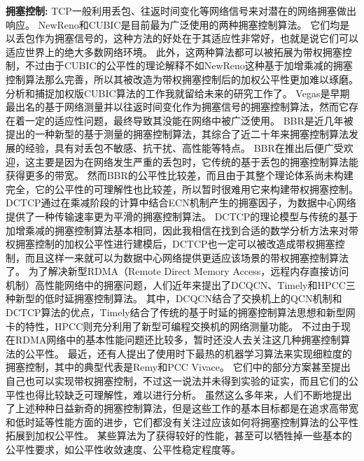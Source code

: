 \documentclass[winfonts]{njuthesis}
\begin{document}
{\bf 拥塞控制: }
TCP一般利用丢包\cite{jacobson1990modified,Henderson2012NewReno,ha2008cubic}、往返时间变化\cite{brakmo1995tcp,cardwell2016bbr,arun2018copa,Zeng2019cc}等网络信号来对潜在的网络拥塞做出响应。
NewReno\cite{Henderson2012NewReno}和CUBIC\cite{ha2008cubic}是目前最为广泛使用的两种拥塞控制算法。
它们均是以丢包作为拥塞信号的，这种方法的好处在于其适应性非常好，也就是说它们可以适应世界上的绝大多数网络环境。
此外，这两种算法都可以被拓展为带权拥塞控制，不过由于CUBIC的公平性的理论解释不如NewReno这种基于加增乘减的拥塞控制算法那么完善，所以其被改造为带权拥塞控制后的加权公平性更加难以琢磨。
分析和捕捉加权版CUBIC算法的工作我就留给未来的研究工作了。
Vegas\cite{brakmo1995tcp}是早期最出名的基于网络测量并以往返时间变化作为拥塞信号的拥塞控制算法，然而它存在着一定的适应性问题，最终导致其没能在网络中被广泛使用。
BBR\cite{cardwell2016bbr}是近几年被提出的一种新型的基于测量的拥塞控制算法，其综合了近二十年来拥塞控制算法发展的经验，具有对丢包不敏感、抗干扰、高性能等特点。
BBR在推出后便广受欢迎，这主要是因为在网络发生严重的丢包时，它传统的基于丢包的拥塞控制算法能获得更多的带宽。
然而BBR的公平性比较差，而且由于其整个理论体系尚未构建完全，它的公平性的可理解性也比较差，所以暂时很难用它来构建带权拥塞控制。
DCTCP\cite{alizadeh2010data,alizadeh2011analysis}通过在乘减阶段的计算中结合ECN机制产生的拥塞因子，为数据中心网络提供了一种传输速率更为平滑的拥塞控制算法。
DCTCP的理论模型与传统的基于加增乘减的拥塞控制算法基本相同，因此我相信在找到合适的数学分析方法来对带权拥塞控制的加权公平性进行建模后，DCTCP也一定可以被改造成带权拥塞控制，而且这样一来就可以为数据中心网络提供更适应该场景的带权拥塞控制算法了。
为了解决新型RDMA（Remote Direct Memory Access，远程内存直接访问机制）高性能网络中的拥塞问题，人们近年来提出了DCQCN\cite{zhu2015congestion}、Timely\cite{mittal2015timely}和HPCC\cite{li2019hpcc}三种新型的低时延拥塞控制算法。
其中，DCQCN结合了交换机上的QCN机制\cite{pan2007qcn}和DCTCP算法\cite{alizadeh2010data}的优点，Timely结合了传统的基于时延的拥塞控制算法思想和新型网卡的特性，HPCC则充分利用了新型可编程交换机的网络测量功能。
不过由于现在RDMA网络中的基本性能问题还比较多，暂时还没人去关注这几种拥塞控制算法的公平性。
最近，还有人提出了使用时下最热的机器学习算法来实现细粒度的拥塞控制，其中的典型代表是Remy\cite{winstein2013remy}和PCC Vivace\cite{dong2018pcc}。
它们中的部分方案甚至提出自己也可以实现带权拥塞控制，不过这一说法并未得到实验的证实，而且它们的公平性也得比较缺乏可理解性，难以进行分析。
虽然这么多年来，人们不断地提出了上述种种日益新奇的拥塞控制算法，但是这些工作的基本目标都是在追求高带宽和低时延等性能方面的进步，它们都没有关注过应该如何将拥塞控制算法的公平性拓展到加权公平性。
某些算法为了获得较好的性能，甚至可以牺牲掉一些基本的公平性要求，如公平性收敛速度、公平性稳定程度等。
\end{document}
